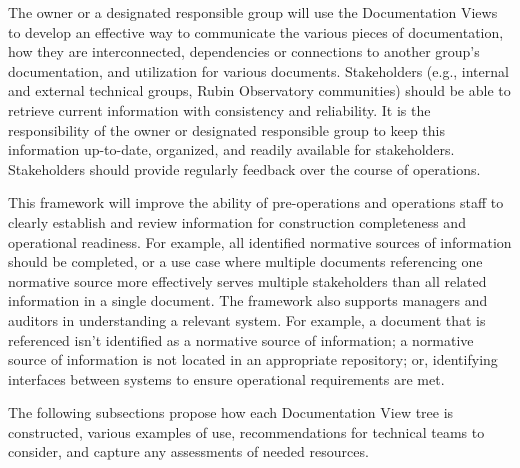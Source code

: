 The owner or a designated responsible group will use the Documentation Views to develop an effective way to communicate the various pieces of documentation, how they are interconnected, dependencies or connections to another group's documentation, and utilization for various documents.
Stakeholders (e.g., internal and external technical groups, Rubin Observatory communities) should be able to retrieve current information with consistency and reliability.
It is the responsibility of the owner or designated responsible group to keep this information up-to-date, organized, and readily available for stakeholders.
Stakeholders should provide regularly feedback over the course of operations.

This framework will improve the ability of pre-operations and operations staff to clearly establish and review information for construction completeness and operational readiness.
For example, all identified normative sources of information should be completed, or a use case where multiple documents referencing one normative source more effectively serves multiple stakeholders than all related information in a single document.
The framework also supports managers and auditors in understanding a relevant system.
For example, a document that is referenced isn't identified as a normative source of information; a normative source of information is not located in an appropriate repository; or, identifying interfaces between systems to ensure operational requirements are met.

The following subsections propose how each Documentation View tree is constructed, various examples of use, recommendations for technical teams to consider, and capture any assessments of needed resources.






